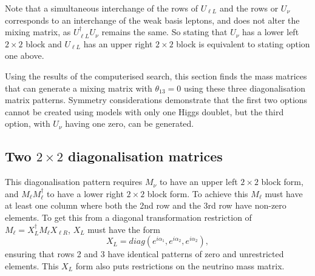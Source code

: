\documentclass[nofootinbib,showpacs]{revtex4}
\begin{document}
Note that a simultaneous interchange of the rows of $U_{\ell L}$ and the rows or $U_\nu$ corresponds to an interchange of the weak basis leptons, and does not alter the mixing matrix, as $U_{\ell L}^\dagger U_\nu$ remains the same. So stating that $U_{\nu}$ has a lower left $2\times 2$ block and $U_{\ell L}$ has an upper right $2\times 2$ block is equivalent to stating option one above. 

Using the results of the computerised search, this section finds the mass matrices that can generate a mixing matrix with $\theta_{13}=0$ using these three diagonalisation matrix patterns. Symmetry considerations demonstrate that the first two options cannot be created using models with only one Higgs doublet, but the third option, with $U_{\nu}$ having one zero, can be generated.

\subsection{Two $2\times 2$ diagonalisation matrices}

This diagonalisation pattern requires $M_\nu$ to have an upper left $2\times 2$ block form, and $M_\ell M_\ell^\dagger$ to have a lower right $2 \times 2$ block form. To achieve this $M_\ell$ must have at least one column where both the 2nd row and the 3rd row have non-zero elements. 
To get this from a diagonal transformation restriction of $M_\ell = X_L^\dagger M_\ell X_{\ell R}$, $X_L$ must have the form
\begin{equation}
X_L=diag(e^{i\alpha_1}, e^{i\alpha_2}, e^{i\alpha_2}),
\end{equation}
ensuring that rows 2 and 3 have identical patterns of zero and unrestricted elements. This $X_L$ form also puts restrictions on the neutrino mass matrix.
\end{document}
